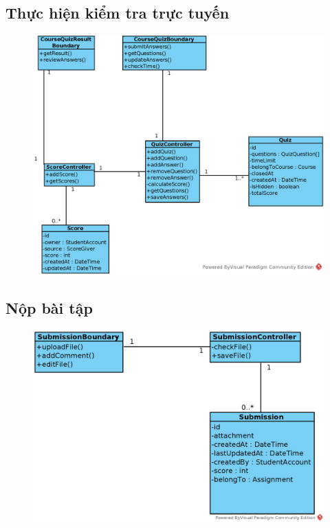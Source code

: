 \documentclass[./../main_file.tex]{subfiles}
\begin{document}
	\subsection{Thực hiện kiểm tra trực tuyến }
	\begin{figure}[H]
		\centering
		\includegraphics[width=\linewidth]{./images/VOPCs/3_7_take_test.eps}
	\end{figure}
	
	\subsection{Nộp bài tập}
	\begin{figure}[H]
		\centering
		\includegraphics[width=.8\linewidth]{./images/VOPCs/3_8_submit_assignment.eps}
	\end{figure}
	
\end{document}
